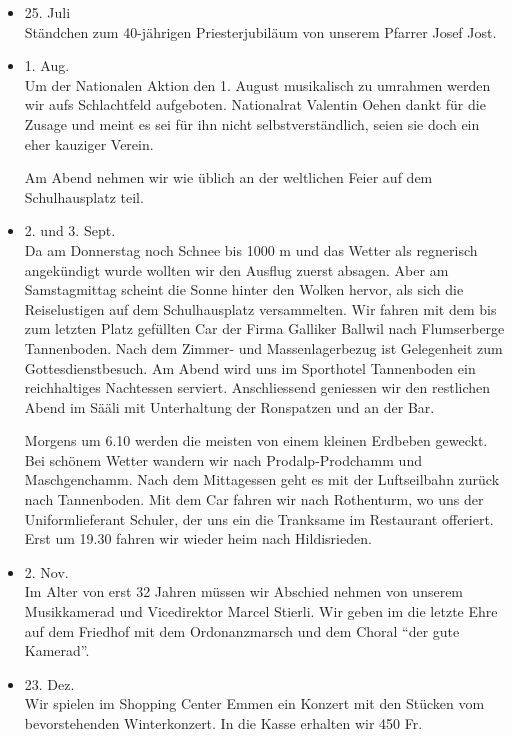 \begin{multicols}{2}
\begin{itemize}
        \item[]25. Juli\\
        Ständchen zum 40-jährigen Priesterjubiläum von unserem Pfarrer Josef
        Jost.

        \item[]1. Aug.\\
        Um der Nationalen Aktion den 1. August musikalisch zu umrahmen werden
        wir aufs Schlachtfeld aufgeboten. Nationalrat Valentin Oehen dankt für
        die Zusage und meint es sei für ihn nicht selbstverständlich, seien sie
        doch ein eher kauziger Verein.

        Am Abend nehmen wir wie üblich an der weltlichen Feier auf dem
        Schulhausplatz teil.

        \item[]2. und 3. Sept.\\
        Da am Donnerstag noch Schnee bis 1000 m und das Wetter als regnerisch
        angekündigt wurde wollten wir den Ausflug zuerst absagen. Aber am
        Samstagmittag scheint die Sonne hinter den Wolken hervor, als sich die
        Reiselustigen auf dem Schulhausplatz versammelten. Wir fahren mit dem
        bis zum letzten Platz gefüllten Car der Firma Galliker Ballwil nach
        Flumserberge Tannenboden. Nach dem Zimmer- und Massenlagerbezug ist
        Gelegenheit zum Gottesdienstbesuch. Am Abend wird uns im Sporthotel
        Tannenboden ein reichhaltiges Nachtessen serviert. Anschliessend
        geniessen wir den restlichen Abend im Sääli mit Unterhaltung der
        Ronspatzen und an der Bar.

        Morgens um 6.10 werden die meisten von einem kleinen Erdbeben geweckt.
        Bei schönem Wetter wandern wir nach Prodalp-Prodchamm und Maschgenchamm.
        Nach dem Mittagessen geht es mit der Luftseilbahn zurück nach
        Tannenboden. Mit dem Car fahren wir nach Rothenturm, wo uns der
        Uniformlieferant Schuler, der uns ein die Tranksame im Restaurant
        offeriert. Erst um 19.30 fahren wir wieder heim nach Hildisrieden.

        \item[]2. Nov.\\
        Im Alter von erst 32 Jahren müssen wir Abschied nehmen von unserem
        Musikkamerad und Vicedirektor Marcel Stierli. Wir geben im die letzte
        Ehre auf dem Friedhof mit dem Ordonanzmarsch und dem Choral "`der gute
        Kamerad"'.

        \item[]23. Dez.\\
        Wir spielen im Shopping Center Emmen ein Konzert mit den Stücken vom
        bevorstehenden Winterkonzert. In die Kasse erhalten wir 450 Fr.

    \end{itemize}

\end{multicols}

